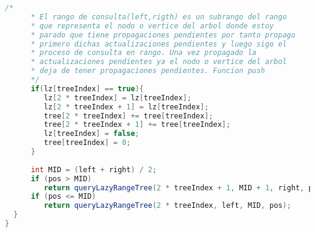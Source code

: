 \begin{lstlisting}[language=Java]
      /*
      * El rango de consulta(left,rigth) es un subrango del rango 
      * que representa el nodo o vertice del arbol donde estoy 
      * parado que tiene propagaciones pendientes por tanto propago 
      * primero dichas actualizaciones pendientes y luego sigo el 
      * proceso de consulta en rango. Una vez propagado la 
      * actualizaciones pendientes ya el nodo o vertice del arbol 
      * deja de tener propagaciones pendientes. Funcion push
      */
      if(lz[treeIndex] == true){
         lz[2 * treeIndex] = lz[treeIndex];
         lz[2 * treeIndex + 1] = lz[treeIndex];
         tree[2 * treeIndex] += tree[treeIndex];
         tree[2 * treeIndex + 1] += tree[treeIndex];
         lz[treeIndex] = false;
         tree[treeIndex] = 0;
      }
		
      int MID = (left + right) / 2;
      if (pos > MID)
         return queryLazyRangeTree(2 * treeIndex + 1, MID + 1, right, pos);
      if (pos <= MID)
         return queryLazyRangeTree(2 * treeIndex, left, MID, pos);
  }
}
\end{lstlisting} 